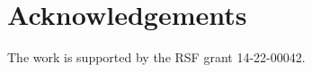 \documentclass{procDDs}
\begin{document}
%
%
%
%
%
%
%
% 
% 
%



\section*{Acknowledgements}

The work is supported by the RSF grant 14-22-00042.
\end{document}
